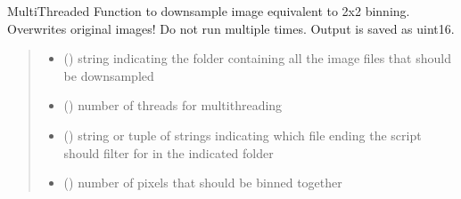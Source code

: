 \documentclass[a4paper,10pt,english,openany,oneside]{sphinxmanual}
\begin{document}
\begin{fulllineitems}
\label{\detokenize{pages/modules:vipertools.image_processing.downsample_folder}}
\pysigstartsignatures
{}
\pysigstopsignatures
\sphinxAtStartPar
Multi\sphinxhyphen{}Threaded Function to downsample image equivalent to 2x2 binning. Overwrites original images! Do not run multiple times.
Output is saved as uint16.
\begin{quote}\begin{description}
\begin{itemize}
\item {} 
\sphinxAtStartPar
{} () \textendash{} string indicating the folder containing all the image files that should be downsampled

\item {} 
\sphinxAtStartPar
{} () \textendash{} number of threads for multithreading

\item {} 
\sphinxAtStartPar
{} (\sphinxstyleliteralemphasis{\sphinxupquote{ | }}\sphinxstyleliteralemphasis{\sphinxupquote{(}}\sphinxstyleliteralemphasis{\sphinxupquote{, }}\sphinxstyleliteralemphasis{\sphinxupquote{)}}) \textendash{} string or tuple of strings indicating which file ending the script should filter for in the indicated folder

\item {} 
\sphinxAtStartPar
{} () \textendash{} number of pixels that should be binned together

\end{itemize}

\end{description}\end{quote}

\end{fulllineitems}
\end{document}
